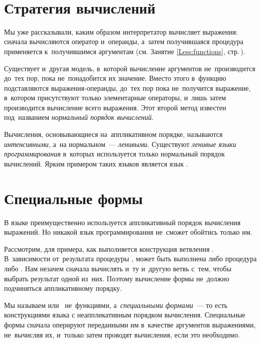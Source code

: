 \label{Less:delayed-computation}
\

\section[2]{Стратегия вычислений}%
\label{normal-order}Мы уже рассказывали, каким образом интерпретатор \Scheme вычисляет выражения: сначала вычисляются оператор и~операнды, а~затем получившаяся процедура применяется к~получившимся аргументам (см. Занятие \ref{Less:functions}, стр.\,\pageref{applicative-order}).

Существует и~другая модель, в~которой вычисление аргументов не~производится до~тех пор, пока не~понадобится их значение. Вместо этого в~функцию подставляются выражения-операнды, до~тех пор пока не~получится выражение, в~котором присутствуют только элементарные операторы, и~лишь затем производится вычисление всего выражения. Этот второй метод известен под~названием \emph{нормальный порядок вычислений}.

Вычисления, основывающиеся на~аппликативном порядке, называются \emph{интенсивными}, а~на нормальном~--- \emph{ленивыми}. Существуют \emph{ленивые языки программирования} в~которых используется только нормальный порядок вычислений. Ярким примером таких языков является язык .

\section[2]{Специальные формы}%
В языке \Scheme преимущественно используется аппликативный порядок вычисления выражений. Но никакой язык программирования не~сможет обойтись только им. 

Рассмотрим, для примера, как выполняется конструкция ветвления . В~зависимости от~результата процедуры , может быть выполнена либо процедура  либо . Нам незачем сначала вычислять и~ту и~другую ветвь с~тем, чтобы выбрать результат одной из~них. Поэтому вычисление формы  не~должно подчиняться аппликативному порядку. 

Мы называем  или~ не~функциями, а~\emph{специальными формами}~--- то есть конструкциями языка с неаппликативным порядком вычисления. Специальные формы сначала оперируют переданными им в~качестве аргументов выражениями, не~вычисляя их, и~только затем проводят вычисления, если это необходимо.


